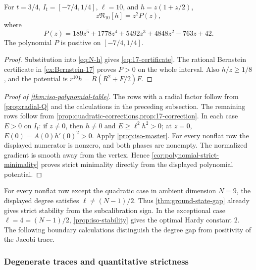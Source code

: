 \begin{proposition}[The \((g,m_1,m_2)=(4,1,7)\) correction]
\label{prop:17-correction}
For \(t=3/4\), \(I_t=[-7/4,1/4]\), \(\ell=10\), and
\(h=z(1+z/2)\),
\begin{equation}\label{eq:17-certificate}
 z\mathfrak N_{10}[h]=z^2P(z),
\end{equation}
where
\begin{equation}\label{eq:P-17}
 P(z)=189z^5+1778z^4+5492z^3+4848z^2-763z+42.
\end{equation}
The polynomial \(P\) is positive on \([-7/4,1/4]\).

\end{proposition}

\begin{proof}
Substitution into \eqref{eq:N-h} gives \eqref{eq:17-certificate}.
The rational Bernstein certificate in \cref{ex:Bernstein-17} proves
\(P>0\) on the whole interval.  Also \(h/z\geq1/8\), and the
potential is \(r^{10}h=R(R^2+F/2)F\).
\end{proof}

\begin{proof}[Proof of \cref{thm:iso-polynomial-table}]
The rows with a radial factor follow from \cref{prop:radial-Q} and the calculations in
the preceding subsection.  The remaining rows follow from
\cref{prop:quadratic-corrections,prop:17-correction}.  In each case \(E>0\) on \(I_t\): if \(z\neq0\), then
\(h\neq0\) and \(E\geq\ell^2h^2>0\); at \(z=0\),
\(E(0)=A(0)h'(0)^2>0\).  Apply \cref{prop:iso-master}.
For every nonflat row the displayed numerator is nonzero, and both phases
are nonempty.  The normalized gradient is smooth away from the
vertex.  Hence \cref{cor:polynomial-strict-minimality} proves strict
minimality directly from the displayed polynomial potential.
\end{proof}

For every nonflat row except the quadratic case in ambient dimension
\(N=9\), the displayed degree satisfies \(\ell\ne(N-1)/2\).
Thus \cref{thm:ground-state-gap} already gives strict stability from
the subcalibration sign. In the exceptional case \(\ell=4=(N-1)/2\),
\cref{prop:iso-stability} gives the optimal Hardy constant \(2\).
The following boundary calculations distinguish the degree gap from
positivity of the Jacobi trace.

\subsubsection{Degenerate traces and quantitative strictness}

